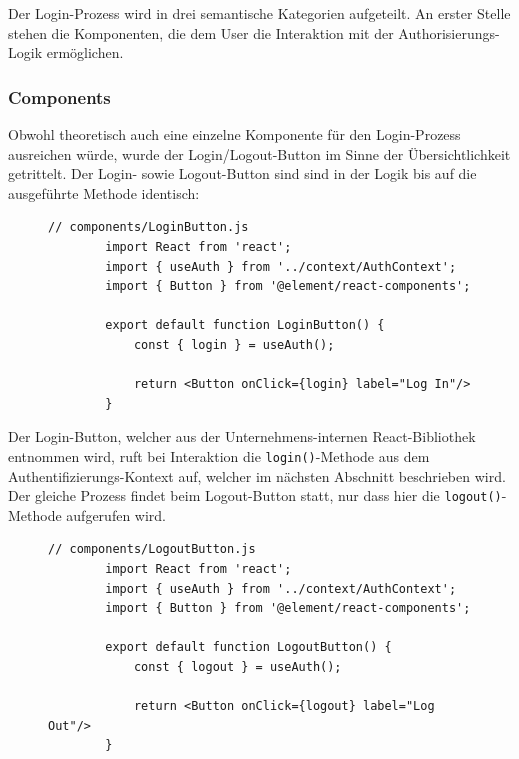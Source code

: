 Der Login-Prozess wird in drei semantische Kategorien aufgeteilt. An erster Stelle stehen die Komponenten,
die dem User die Interaktion mit der Authorisierungs-Logik ermöglichen. 
\subsubsection{Components}
Obwohl theoretisch auch eine einzelne Komponente für den Login-Prozess ausreichen würde, wurde der Login/Logout-Button
im Sinne der Übersichtlichkeit getrittelt. Der Login- sowie Logout-Button sind sind in der Logik bis auf die ausgeführte Methode identisch:
\begin{figure}[H]
    \begin{lstlisting}[caption=JS-Code for the LogIn-Button, label=list:loginbutton]
        // components/LoginButton.js
        import React from 'react';
        import { useAuth } from '../context/AuthContext';
        import { Button } from '@element/react-components';

        export default function LoginButton() {
            const { login } = useAuth();

            return <Button onClick={login} label="Log In"/>
        }
    \end{lstlisting}
\end{figure}
Der Login-Button, welcher aus der Unternehmens-internen React-Bibliothek entnommen wird, ruft bei Interaktion die \texttt{login()}-Methode 
aus dem Authentifizierungs-Kontext auf, welcher im nächsten Abschnitt beschrieben wird.\break
Der gleiche Prozess findet beim Logout-Button statt, nur dass hier die \texttt{logout()}-Methode aufgerufen wird.
\begin{figure}[H]
    \begin{lstlisting}[caption=JS-Code for the LogOut-Button, label=list:logoutbutton]
        // components/LogoutButton.js
        import React from 'react';
        import { useAuth } from '../context/AuthContext';
        import { Button } from '@element/react-components';

        export default function LogoutButton() {
            const { logout } = useAuth();

            return <Button onClick={logout} label="Log Out"/>
        }
    \end{lstlisting}
\end{figure}
